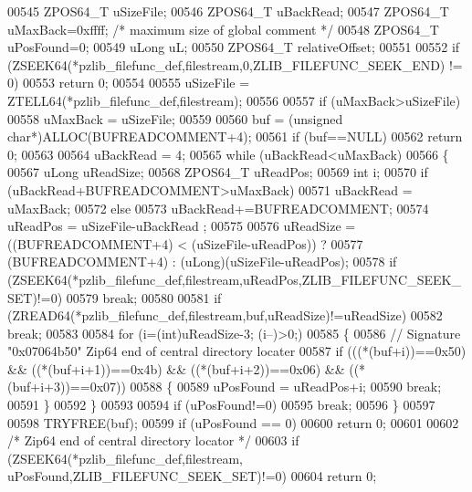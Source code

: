 \begin{DoxyCode}
00545   ZPOS64\_T uSizeFile;
00546   ZPOS64\_T uBackRead;
00547   ZPOS64\_T uMaxBack=0xffff; \textcolor{comment}{/* maximum size of global comment */}
00548   ZPOS64\_T uPosFound=0;
00549   uLong uL;
00550   ZPOS64\_T relativeOffset;
00551 
00552   \textcolor{keywordflow}{if} (ZSEEK64(*pzlib\_filefunc\_def,filestream,0,ZLIB\_FILEFUNC\_SEEK\_END) != 0)
00553     \textcolor{keywordflow}{return} 0;
00554 
00555   uSizeFile = ZTELL64(*pzlib\_filefunc\_def,filestream);
00556 
00557   \textcolor{keywordflow}{if} (uMaxBack>uSizeFile)
00558     uMaxBack = uSizeFile;
00559 
00560   buf = (\textcolor{keywordtype}{unsigned} \textcolor{keywordtype}{char}*)ALLOC(BUFREADCOMMENT+4);
00561   \textcolor{keywordflow}{if} (buf==NULL)
00562     \textcolor{keywordflow}{return} 0;
00563 
00564   uBackRead = 4;
00565   \textcolor{keywordflow}{while} (uBackRead<uMaxBack)
00566   \{
00567     uLong uReadSize;
00568     ZPOS64\_T uReadPos;
00569     \textcolor{keywordtype}{int} i;
00570     \textcolor{keywordflow}{if} (uBackRead+BUFREADCOMMENT>uMaxBack)
00571       uBackRead = uMaxBack;
00572     \textcolor{keywordflow}{else}
00573       uBackRead+=BUFREADCOMMENT;
00574     uReadPos = uSizeFile-uBackRead ;
00575 
00576     uReadSize = ((BUFREADCOMMENT+4) < (uSizeFile-uReadPos)) ?
00577       (BUFREADCOMMENT+4) : (uLong)(uSizeFile-uReadPos);
00578     \textcolor{keywordflow}{if} (ZSEEK64(*pzlib\_filefunc\_def,filestream,uReadPos,ZLIB\_FILEFUNC\_SEEK\_SET)!=0)
00579       \textcolor{keywordflow}{break};
00580 
00581     \textcolor{keywordflow}{if} (ZREAD64(*pzlib\_filefunc\_def,filestream,buf,uReadSize)!=uReadSize)
00582       \textcolor{keywordflow}{break};
00583 
00584     \textcolor{keywordflow}{for} (i=(\textcolor{keywordtype}{int})uReadSize-3; (i--)>0;)
00585     \{
00586       \textcolor{comment}{// Signature "0x07064b50" Zip64 end of central directory locater}
00587       \textcolor{keywordflow}{if} (((*(buf+i))==0x50) && ((*(buf+i+1))==0x4b) && ((*(buf+i+2))==0x06) && ((*(buf+i+3))==0x07))
00588       \{
00589         uPosFound = uReadPos+i;
00590         \textcolor{keywordflow}{break};
00591       \}
00592     \}
00593 
00594       \textcolor{keywordflow}{if} (uPosFound!=0)
00595         \textcolor{keywordflow}{break};
00596   \}
00597 
00598   TRYFREE(buf);
00599   \textcolor{keywordflow}{if} (uPosFound == 0)
00600     \textcolor{keywordflow}{return} 0;
00601 
00602   \textcolor{comment}{/* Zip64 end of central directory locator */}
00603   \textcolor{keywordflow}{if} (ZSEEK64(*pzlib\_filefunc\_def,filestream, uPosFound,ZLIB\_FILEFUNC\_SEEK\_SET)!=0)
00604     \textcolor{keywordflow}{return} 0;

\end{DoxyCode}
